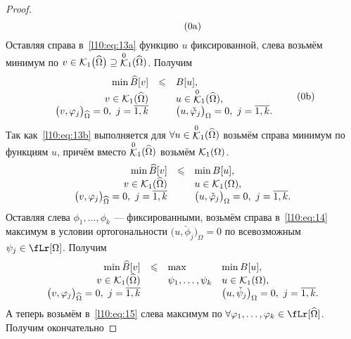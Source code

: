 \begin{proof}
\begin{equation}
\begin{array}{rcl}
		\end{array}\tag{\theequation a}\hfill
	\end{equation} 
	Оставляя справа в~\eqref{l10:eq:13a} функцию $u$ фиксированной, слева возьмём минимум по $v\in\K_1\big(\widehat{\Omega}\big)\?\supseteq{\mathop{\K}\limits^0}_1(\widehat{\Omega})$. Получим
	\begin{equation}\label{l10:eq:13b}
		\hfill\begin{array}{rcl}
			\min\widehat{B}[v]&\leqslant&B[u],\\
			v\in\K_1(\widehat{\Omega})& &u\in{\mathop{\K}\limits^0}_1(\widehat{\Omega}),\\
			\big(v,\phi_j\big)_{\widehat{\Omega}}=0,\ j=\overline{1,k}&  &\big(u,\check{\phi}_j\big)_{\Omega}=0,\ j=\overline{1,k}.
		\end{array}\tag{\theequation b}\hfill
	\end{equation} 
	Так как~\eqref{l10:eq:13b} выполняется для $\forall u\in{\mathop{\ensuremath{\mathcal{K}}}\limits^0}_1(\widehat{\Omega})$ возьмём справа минимум по функциям $u$, причём вместо ${\mathop{\mathcal{K}}\limits^0}_1(\widehat{\Omega})$ возьмём $\mathcal{K}_1(\Omega)$.
	\begin{equation}\label{l10:eq:14}
		\hfill\begin{array}{rcl}
			\min\widehat{B}[v]&\leqslant&\min B[u],\\
			v\in\K_1(\widehat{\Omega})& &u\in\K_1(\Omega),\\
			\big(v,\phi_j\big)_{\widehat{\Omega}}=0,\ j=\overline{1,k}&  &\big(u,\check{\phi}_j\big)_{\Omega}=0,\ j=\overline{1,k}.
		\end{array}\hfill
	\end{equation} 
	Оставляя слева $\phi_1,\ldots,\phi_k$ --- фиксированными, возьмём справа в~\eqref{l10:eq:14} максимум в условии ортогональности $\big(u,\check{\phi}_j\big)_{\Omega}=0$ по всевозможным $\psi_j\in\fLr[\Omega]$. Получим
	\begin{equation}\label{l10:eq:15}
		\hfill\begin{array}{rcll}
			\min\widehat{B}[v]&\leqslant&\max&\min B[u],\\
			v\in\K_1(\widehat{\Omega})&  &\psi_1,\ldots,\psi_k &u\in\K_1(\Omega),\\
			\big(v,\phi_j\big)_{\widehat{\Omega}}=0,\ j=\overline{1,k}& &   &\big(u,\check{\psi}_j\big)_{\Omega}=0,\ j=\overline{1,k}.
		\end{array}\hfill
	\end{equation}
	А теперь возьмём в~\eqref{l10:eq:15} слева максимум по $\forall\phi_1,\ldots,\phi_k\in\fLr[\widehat{\Omega}]$. Получим окончательно

\end{proof}
